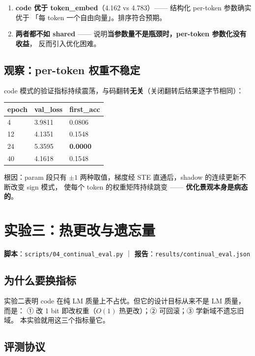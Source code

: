 \documentclass[11pt,a4paper]{ctexart}
\newcommand{\warn}[1]{\textcolor{warnred}{\textbf{#1}}}
\begin{document}
\begin{enumerate}
\item \textbf{code 优于 token\_embed}（4.162 vs 4.783）—— 结构化 per-token 参数确实优于
      「每 token 一个自由向量」。排序符合预期。
\item \textbf{两者都不如 shared} —— 说明\textbf{当参数量不是瓶颈时，per-token 参数化没有收益}，
      反而引入优化困难。
\end{enumerate}

\subsection{观察：per-token 权重不稳定}

code 模式的验证指标持续震荡，与码翻转\textbf{无关}（关闭翻转后结果逐字节相同）：

\begin{center}
\begin{tabular}{@{}lll@{}}
\toprule
epoch & val\_loss & first\_acc \\
\midrule
4 & 3.9811 & 0.0806 \\
12 & 4.1351 & 0.1548 \\
24 & 5.3595 & \warn{0.0000} \\
40 & 4.1618 & 0.1548 \\
\bottomrule
\end{tabular}
\end{center}

根因：param 段只有 $\pm1$ 两种取值，梯度经 STE 直通后，shadow 的连续更新不断改变 sign 模式，
使每个 token 的权重矩阵持续跳变 —— \textbf{优化景观本身是病态的}。

\section{实验三：热更改与遗忘量}

\textbf{脚本}：\texttt{scripts/04\_continual\_eval.py} ｜
\textbf{报告}：\texttt{results/continual\_eval.json}

\subsection{为什么要换指标}

实验二表明 code 在纯 LM 质量上不占优。但它的设计目标从来不是 LM 质量，而是：
① 改 1 bit 即改权重（$O(1)$ 热更改）；② 可回滚；③ 学新域不遗忘旧域。
本实验就用这三个指标量它。

\subsection{评测协议}
\end{document}
